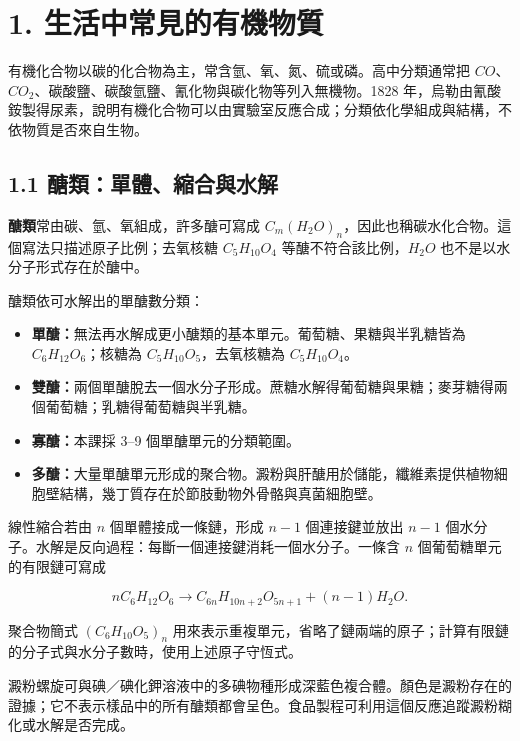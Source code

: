 \documentclass[11pt,a4paper]{article}
\providecommand{\tightlist}{%
  \setlength{\itemsep}{0pt}\setlength{\parskip}{0pt}}
\begin{document}
\section{1. 生活中常見的有機物質}\label{ux751fux6d3bux4e2dux5e38ux898bux7684ux6709ux6a5fux7269ux8cea}

有機化合物以碳的化合物為主，常含氫、氧、氮、硫或磷。高中分類通常把 \(CO\)、\(CO_2\)、碳酸鹽、碳酸氫鹽、氰化物與碳化物等列入無機物。1828 年，烏勒由氰酸銨製得尿素，說明有機化合物可以由實驗室反應合成；分類依化學組成與結構，不依物質是否來自生物。

\subsection{1.1 醣類：單體、縮合與水解}\label{ux91a3ux985eux55aeux9ad4ux7e2eux5408ux8207ux6c34ux89e3}

\textbf{醣類}常由碳、氫、氧組成，許多醣可寫成 \(C_m(H_2O)_n\)，因此也稱碳水化合物。這個寫法只描述原子比例；去氧核糖 \(C_5H_{10}O_4\) 等醣不符合該比例，\(H_2O\) 也不是以水分子形式存在於醣中。

醣類依可水解出的單醣數分類：

\begin{itemize}
\tightlist
\item
  \textbf{單醣：}無法再水解成更小醣類的基本單元。葡萄糖、果糖與半乳糖皆為 \(C_6H_{12}O_6\)；核糖為 \(C_5H_{10}O_5\)，去氧核糖為 \(C_5H_{10}O_4\)。
\item
  \textbf{雙醣：}兩個單醣脫去一個水分子形成。蔗糖水解得葡萄糖與果糖；麥芽糖得兩個葡萄糖；乳糖得葡萄糖與半乳糖。
\item
  \textbf{寡醣：}本課採 3--9 個單醣單元的分類範圍。
\item
  \textbf{多醣：}大量單醣單元形成的聚合物。澱粉與肝醣用於儲能，纖維素提供植物細胞壁結構，幾丁質存在於節肢動物外骨骼與真菌細胞壁。
\end{itemize}

線性縮合若由 \(n\) 個單體接成一條鏈，形成 \(n-1\) 個連接鍵並放出 \(n-1\) 個水分子。水解是反向過程：每斷一個連接鍵消耗一個水分子。一條含 \(n\) 個葡萄糖單元的有限鏈可寫成

\[
nC_6H_{12}O_6\rightarrow C_{6n}H_{10n+2}O_{5n+1}+(n-1)H_2O.
\]

聚合物簡式 \((C_6H_{10}O_5)_n\) 用來表示重複單元，省略了鏈兩端的原子；計算有限鏈的分子式與水分子數時，使用上述原子守恆式。

澱粉螺旋可與碘／碘化鉀溶液中的多碘物種形成深藍色複合體。顏色是澱粉存在的證據；它不表示樣品中的所有醣類都會呈色。食品製程可利用這個反應追蹤澱粉糊化或水解是否完成。
\end{document}
